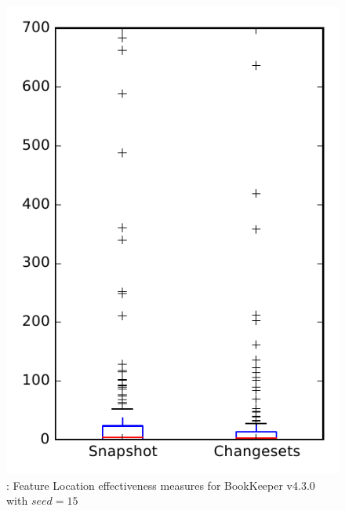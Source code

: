 
\begin{figure}
\centering
\includegraphics[height=0.4\textheight]{figures/flt_seed/rq1_bookkeeper_15}
\caption{\rone: Feature Location effectiveness measures for BookKeeper v4.3.0 with $seed=15$}
\label{fig:flt_seed:rq1:bookkeeper}
\end{figure}
